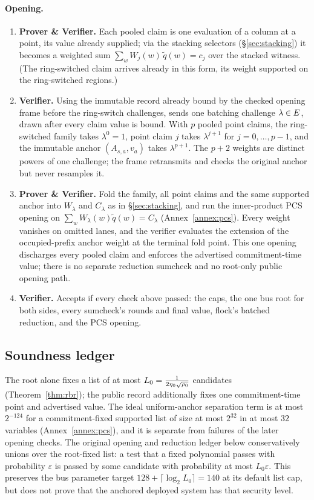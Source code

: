 \paragraph{Opening.}

\begin{enumerate}
\item \textbf{Prover \& Verifier.} Each pooled claim is one evaluation of a column at a point, its value already supplied; via the stacking selectors (\S\ref{sec:stacking}) it becomes a weighted sum $\sum_w W_j(w)\,\widetilde q(w)=c_j$ over the stacked witness. (The ring-switched claim arrives already in this form, its weight supported on the ring-switched regions.)
\item \textbf{Verifier.} Using the immutable record already bound by the checked opening frame before the ring-switch challenges, sends one batching challenge $\lambda\in E$, drawn after every claim value is bound. With $p$ pooled point claims, the ring-switched family takes $\lambda^0=1$, point claim $j$ takes $\lambda^{j+1}$ for $j=0,\dots,p-1$, and the immutable anchor $(A_{s,a},v_a)$ takes $\lambda^{p+1}$. The $p+2$ weights are distinct powers of one challenge; the frame retransmits and checks the original anchor but never resamples it.
\item \textbf{Prover \& Verifier.} Fold the family, all point claims and the same supported anchor into $W_\lambda$ and $C_\lambda$ as in \S\ref{sec:stacking}, and run the inner-product PCS opening on $\sum_wW_\lambda(w)\widetilde q(w)=C_\lambda$ (Annex~\ref{annex:pcs}). Every weight vanishes on omitted lanes, and the verifier evaluates the extension of the occupied-prefix anchor weight at the terminal fold point. This one opening discharges every pooled claim and enforces the advertised commitment-time value; there is no separate reduction sumcheck and no root-only public opening path.
\item \textbf{Verifier.} Accepts if every check above passed: the caps, the one bus root for both sides, every sumcheck's rounds and final value, flock's batched reduction, and the PCS opening.
\end{enumerate}

\subsection{Soundness ledger}\label{sec:e2e-ledger}

The root alone fixes a list of at most $L_0=\tfrac{1}{2\eta_0\sqrt{\rho_0}}$ candidates (Theorem~\ref{thm:rbr}); the public record additionally fixes one commitment-time point and advertised value. The ideal uniform-anchor separation term is at most $2^{-124}$ for a commitment-fixed supported list of size at most $2^{32}$ in at most $32$ variables (Annex~\ref{annex:pcs}), and it is separate from failures of the later opening checks. The original opening and reduction ledger below conservatively unions over the root-fixed list: a test that a fixed polynomial passes with probability $\varepsilon$ is passed by some candidate with probability at most $L_0\varepsilon$. This preserves the bus parameter target $128+\lceil\log_2L_0\rceil=140$ at its default list cap, but does not prove that the anchored deployed system has that security level.

